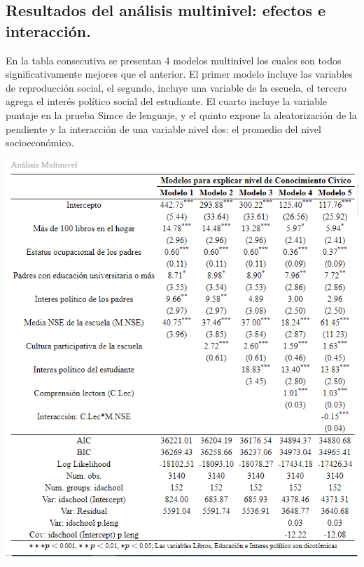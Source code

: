 \documentclass[12pt,twoside]{templates/facsothesis}
\begin{document}
\newpage

\hypertarget{resultados-del-anuxe1lisis-multinivel-efectos-e-interacciuxf3n.}{%
\subsection{Resultados del análisis multinivel: efectos e interacción.}\label{resultados-del-anuxe1lisis-multinivel-efectos-e-interacciuxf3n.}}

En la tabla consecutiva se presentan 4 modelos multinivel los cuales son todos significativamente mejores que el anterior. El primer modelo incluye las variables de reproducción social, el segundo, incluye una variable de la escuela, el tercero agrega el interés político social del estudiante. El cuarto incluye la variable puntaje en la prueba Simce de lenguaje, y el quinto expone la aleatorización de la pendiente y la interacción de una variable nivel dos: el promedio del nivel socioeconómico.

\begin{center}\includegraphics[width=1.2\linewidth,]{images/regmultinivel} \end{center}
\end{document}
